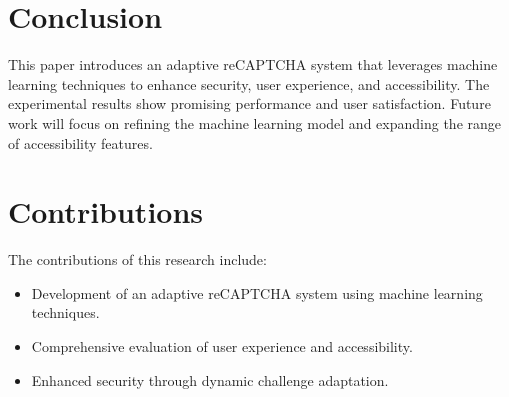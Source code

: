 \documentclass{article}
\begin{document}
\section{Conclusion}
This paper introduces an adaptive reCAPTCHA system that leverages machine learning techniques to enhance security, user experience, and accessibility. The experimental results show promising performance and user satisfaction. Future work will focus on refining the machine learning model and expanding the range of accessibility features.

\section{Contributions}
The contributions of this research include:
\begin{itemize}
    \item Development of an adaptive reCAPTCHA system using machine learning techniques.
    \item Comprehensive evaluation of user experience and accessibility.
    \item Enhanced security through dynamic challenge adaptation.
\end{itemize}
\end{document}
